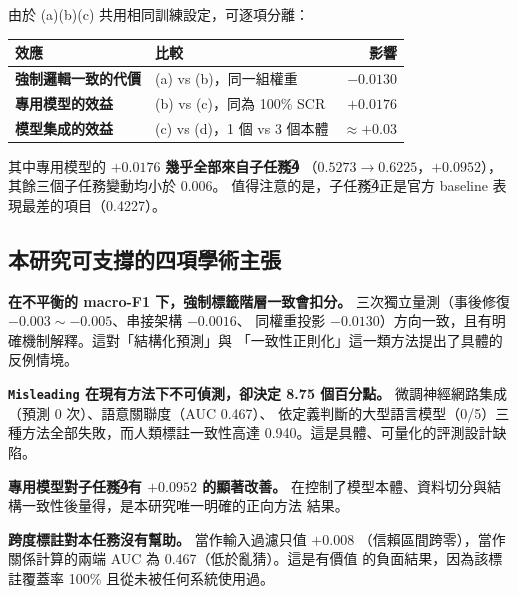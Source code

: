 \documentclass[11pt,a4paper]{ctexart}
\newcommand{\fieldname}[1]{\texttt{#1}}
\begin{document}
由於 (a)(b)(c) 共用相同訓練設定，可逐項分離：

\begin{table}[h]
\centering
\small
\begin{tabular}{@{}llr@{}}
\toprule
效應 & 比較 & 影響 \\
\midrule
\textbf{強制邏輯一致的代價} & (a) vs (b)，同一組權重      & $\mathbf{-0.0130}$ \\
\textbf{專用模型的效益}     & (b) vs (c)，同為 100\% SCR  & $\mathbf{+0.0176}$ \\
\textbf{模型集成的效益}     & (c) vs (d)，1 個 vs 3 個本體 & $\approx \mathbf{+0.03}$ \\
\bottomrule
\end{tabular}
\end{table}

其中專用模型的 $+0.0176$ \textbf{幾乎全部來自子任務\textcircled{4}}
（$0.5273 \to 0.6225$，\textbf{$+0.0952$}），其餘三個子任務變動均小於 0.006。
值得注意的是，子任務\textcircled{4}正是官方 baseline 表現最差的項目（0.4227）。

\subsection{本研究可支撐的四項學術主張}

\begin{description}[leftmargin=1.5em, itemsep=5pt]
  \item[主張一] \textbf{在不平衡的 macro-F1 下，強制標籤階層一致會扣分。}
        三次獨立量測（事後修復 $-0.003 \sim -0.005$、串接架構 $-0.0016$、
        同權重投影 $-0.0130$）方向一致，且有明確機制解釋。這對「結構化預測」與
        「一致性正則化」這一類方法提出了具體的反例情境。
  \item[主張二] \textbf{\fieldname{Misleading} 在現有方法下不可偵測，卻決定
        8.75 個百分點。} 微調神經網路集成（預測 0 次）、語意關聯度（AUC 0.467）、
        依定義判斷的大型語言模型（0/5）三種方法全部失敗，而人類標註一致性高達
        0.940。這是具體、可量化的評測設計缺陷。
  \item[主張三] \textbf{專用模型對子任務\textcircled{4}有 $+0.0952$ 的顯著改善。}
        在控制了模型本體、資料切分與結構一致性後量得，是本研究唯一明確的正向方法
        結果。
  \item[主張四] \textbf{跨度標註對本任務沒有幫助。} 當作輸入過濾只值 $+0.008$
        （信賴區間跨零），當作關係計算的兩端 AUC 為 0.467（低於亂猜）。這是有價值
        的負面結果，因為該標註覆蓋率 100\% 且從未被任何系統使用過。
\end{description}
\end{document}
